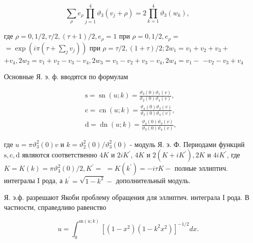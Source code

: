 \documentclass[10pt]{article}
\begin{document}
\[

\sum_{\rho} e_{\rho} \prod_{j=1}^{4} \vartheta_{3}\left(v_{j}+\rho\right)=2 \prod_{k=1}^{4} \vartheta_{3}\left(w_{k}\right) \text {, }

\]



где $\rho=0,1 / 2, \tau / 2,(\tau+1) / 2, e_{\rho}=1$ при $\rho=0,1 / 2, e_{\rho}=$ $=\exp \left(i \pi\left(\tau+\sum_{j} v_{j}\right)\right)$ при $\rho=\tau / 2,(1+\tau) / 2 ; 2 w_{1}=v_{1}+v_{2}+v_{3}+$ $+v_{4}, 2 w_{2}=v_{1}+v_{2}-v_{3}-v_{4}, 2 w_{3}=v_{1}-v_{2}+v_{3}-v_{4}, 2 w_{4}=v_{1}-$ $-v_{2}-v_{3}+v_{4}$



Основные Я. э. ф. вводятся по формулам



\[

\begin{aligned}

& \mathrm{s}=\operatorname{sn}(u ; k)=\frac{\vartheta_{3}(0) \vartheta_{1}(v)}{\vartheta_{2}(0) \vartheta_{4}(v)}, \\

& \mathrm{c}=\operatorname{cn}(u ; k)=\frac{\vartheta_{4}(0) \vartheta_{2}(v)}{\vartheta_{2}(0) \vartheta_{4}(v)}, \\

& \mathrm{d}=\operatorname{dn}(u ; k)=\frac{\vartheta_{4}(0) \vartheta_{3}(v)}{\vartheta_{3}(0) \vartheta_{4}(v)},

\end{aligned}

\]



где $u=\pi \vartheta_{3}^{2}(0) v$ и $k=\vartheta_{2}^{2}(0) / \vartheta_{3}^{2}(0)$ - модуль Я. э. Ф. Периодами функций $\mathrm{s}, \mathrm{c}, \mathrm{d}$ являются соответственно $4 K$ и $2 i K^{\prime}$, $4 K$ и $2\left(K+i K^{\prime}\right), 2 K$ и $4 i K^{\prime}$, где $K=K(k)=\pi \vartheta_{3}^{2}(0) / 2, K^{\prime}=$ $=K\left(k^{\prime}\right)=-i \tau K-$ полные эллиптич. интегралы I рода, а $k^{\prime}=\sqrt{1-k^{2}}-$ дополнительный модуль.



Я. э.ф. разрешают Якоби проблему обращения для эллиптич. интеграла I рода. В частности, справедливо равенство



\[

u=\int_{0}^{\mathrm{sn}(u ; k)}\left[\left(1-x^{2}\right)\left(1-k^{2} x^{2}\right)\right]^{-1 / 2} d x .

\]
\end{document}
